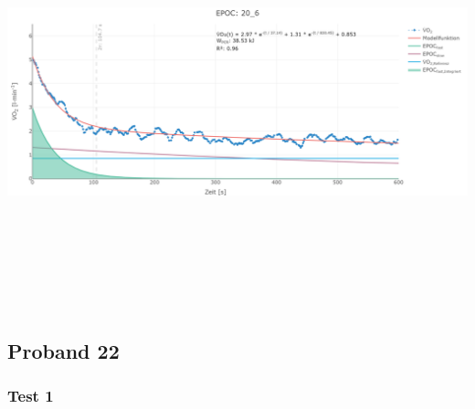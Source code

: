 \documentclass[
  letterpaper,
  DIV=11]{scrartcl}
\begin{document}
\includegraphics[width=11.45833in,height=4.6875in]{images/20_6.png}

\subsection{Proband 22}

\subsubsection{Test 1}
\end{document}
